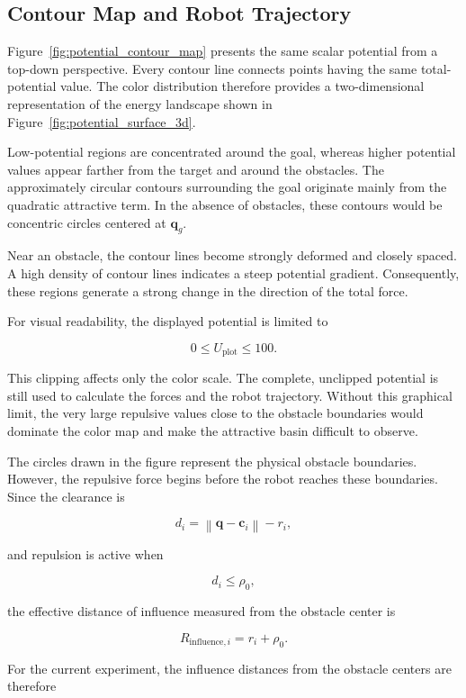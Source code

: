 \documentclass[10pt,twocolumn,a4paper]{article}
\begin{document}
\subsection{Contour Map and Robot Trajectory}

Figure~\ref{fig:potential_contour_map} presents the same scalar potential
from a top-down perspective. Every contour line connects points having the
same total-potential value. The color distribution therefore provides a
two-dimensional representation of the energy landscape shown in
Figure~\ref{fig:potential_surface_3d}.

Low-potential regions are concentrated around the goal, whereas higher
potential values appear farther from the target and around the obstacles.
The approximately circular contours surrounding the goal originate mainly
from the quadratic attractive term. In the absence of obstacles, these
contours would be concentric circles centered at $\mathbf{q}_g$.

Near an obstacle, the contour lines become strongly deformed and closely
spaced. A high density of contour lines indicates a steep potential
gradient. Consequently, these regions generate a strong change in the
direction of the total force.

For visual readability, the displayed potential is limited to

\[
    0
    \leq
    U_{\mathrm{plot}}
    \leq
    100.
\]

This clipping affects only the color scale. The complete, unclipped
potential is still used to calculate the forces and the robot trajectory.
Without this graphical limit, the very large repulsive values close to the
obstacle boundaries would dominate the color map and make the attractive
basin difficult to observe.

The circles drawn in the figure represent the physical obstacle boundaries.
However, the repulsive force begins before the robot reaches these
boundaries. Since the clearance is

\[
    d_i
    =
    \left\|
        \mathbf{q}-\mathbf{c}_i
    \right\|
    -
    r_i,
\]

and repulsion is active when

\[
    d_i
    \leq
    \rho_0,
\]

the effective distance of influence measured from the obstacle center is

\[
    R_{\mathrm{influence},i}
    =
    r_i+\rho_0.
\]

For the current experiment, the influence distances from the obstacle
centers are therefore
\end{document}
